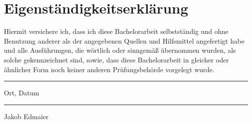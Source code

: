 \chapter*{Eigenständigkeitserklärung}

Hiermit versichere ich, dass ich diese Bachelorarbeit selbstständig und ohne Benutzung anderer als der angegebenen Quellen und Hilfsmittel angefertigt habe und alle Ausführungen, die wörtlich oder sinngemäß übernommen wurden, als solche gekennzeichnet sind, sowie, dass diese Bachelorarbeit in gleicher oder ähnlicher Form noch keiner anderen Prüfungsbehörde vorgelegt wurde.

\vspace{8em}
\begin{Form}
\noindent \parbox{6cm}{\hrule \strut \centering\footnotesize Ort, Datum} 
\hfill
\parbox{6cm}{\hrule \strut \centering\footnotesize Jakob Edmaier}
\end{Form}
